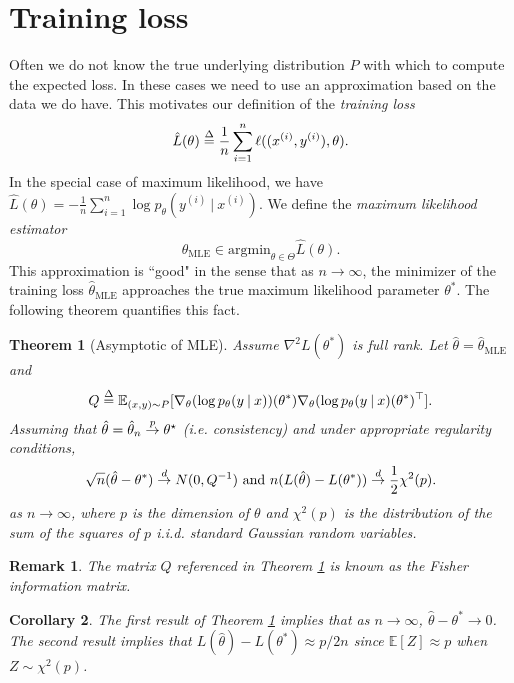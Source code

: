 \documentclass[11pt]{article}
\newcommand\defn{\stackrel{\mathclap{\tiny\Delta}}{=}}
\newcommand\E{\mathbb{E}}
\newtheorem{theorem}{Theorem}
\newtheorem{cor}[theorem]{Corollary}
\newtheorem*{remark*}{Remark}
\begin{document}
\section{Training loss}
Often we do not know the true underlying distribution $P$ with which to compute the expected loss. In these cases we need to use an approximation based on the data we do have. This motivates our definition of the \textit{training loss} $$\hat{L}(\theta) \defn \frac1n \sum_{i=1}^n \ell((x^{(i)},y^{(i)}),\theta).$$ In the special case of maximum likelihood, we have $\hat{L}(\theta) = -\frac1n \sum_{i=1}^n \log p_\theta(y^{(i)}\: | \:x^{(i)})$. We define the \textit{maximum likelihood estimator} $$\hat{\theta}_{\mathrm{MLE}} \in \mathrm{argmin}_{\theta\in\Theta} \hat{L}(\theta).$$ This approximation is ``good" in the sense that as $n\rightarrow\infty$, the minimizer of the training loss $\hat{\theta}_\mathrm{MLE}$ approaches the true maximum likelihood parameter $\theta^*$. The following theorem quantifies this fact.
\begin{theorem}[Asymptotic of MLE] \label{mle}
  Assume $\nabla^2 L(\theta^*)$ is full rank. Let $\hat{\theta} = \hat{\theta}_{\mathrm{MLE}}$ and $$Q \defn \E_{(x,y)\sim P}[\nabla_\theta(\log p_\theta(y\: | \: x))(\theta^*) \nabla_\theta(\log p_\theta(y\: | \: x)(\theta^*)^\top].$$
  Assuming that $\hat{\theta}=\hat{\theta}_n\stackrel{\tiny p}{\rightarrow}\theta^\star$ (i.e. consistency) and under appropriate regularity conditions,  $$\sqrt{n}(\hat{\theta}-\theta^*)\stackrel{\tiny d}{\rightarrow} N(0, Q^{-1}) \textup{ and } n(L(\hat{\theta}) - L(\theta^*))\stackrel{\tiny d}{\rightarrow} \frac12 \chi^2(p).$$ as $n\rightarrow\infty$, where $p$ is the dimension of $\theta$ and $\chi^2(p)$ is the distribution of the sum of the squares of $p$ i.i.d. standard Gaussian random variables.
\end{theorem}
\begin{remark*}
The matrix $Q$ referenced in Theorem \ref{mle} is known as the \textit{Fisher information matrix}.
\end{remark*}
\begin{cor}
The first result of Theorem \ref{mle} implies that as $n\rightarrow\infty$, $\hat{\theta}-\theta^*\rightarrow 0$. The second result implies that $L(\hat{\theta}) - L(\theta^*) \approx p/2n$ since $\E[Z] \approx p$ when $Z\sim \chi^2(p)$.
\end{cor}

\end{document}
